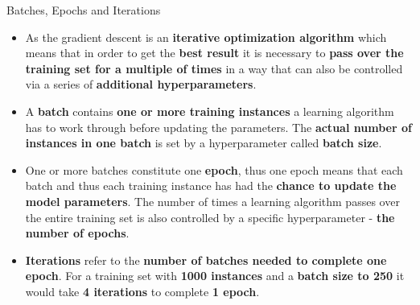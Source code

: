 \documentclass[main.tex]{subfiles}
\begin{document}
    \begin{frame}{Batches, Epochs and Iterations}
        \begin{itemize}
            \item As the gradient descent is an \textbf{iterative optimization algorithm} which means that in order to get the \textbf{best result} it is necessary to \textbf{pass over the training set for a multiple  of times} in a way that can also be controlled via a series of \textbf{additional hyperparameters}.
            \item A \textbf{batch} contains \textbf{one or more training instances} a learning algorithm has to work through before updating the parameters. The \textbf{actual number of instances in one batch} is set by a hyperparameter called \textbf{batch size}.
            \item One or more batches constitute one \textbf{epoch}, thus one epoch means that each batch and thus each training instance has had the \textbf{chance to update the model parameters}. The number of times a learning algorithm passes over the entire training set is also controlled by a specific hyperparameter - \textbf{the number of epochs}.
            \item \textbf{Iterations} refer to the \textbf{number of batches needed to complete one epoch}. For a training set with \textbf{1000 instances} and a \textbf{batch size to 250} it would take \textbf{4 iterations} to complete \textbf{1 epoch}.
        \end{itemize}
    \end{frame}
\end{document}
